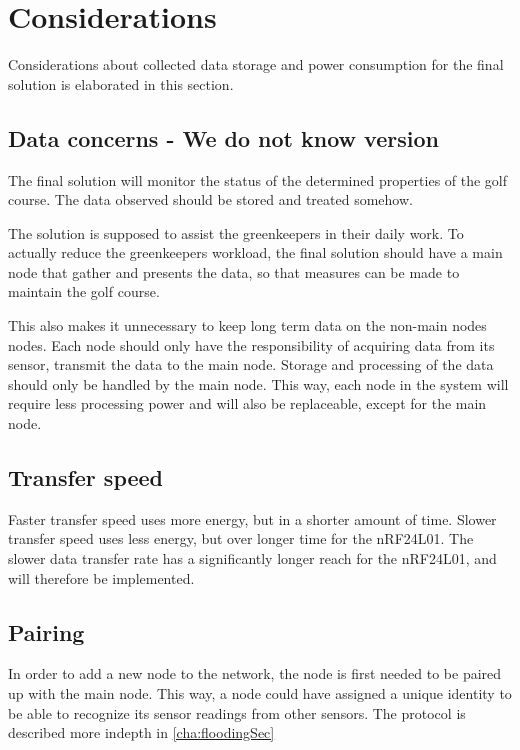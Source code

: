 \section{Considerations}
Considerations about collected data storage and power consumption for the final solution is elaborated in this section.

\subsection*{Data concerns - We do not know version}
The final solution will monitor the status of the determined properties of the golf course. The data observed should be stored and treated somehow.

The solution is supposed to assist the greenkeepers in their daily work. To actually reduce the greenkeepers workload, the final solution should have a main node that gather and presents the data, so that measures can be made to maintain the golf course.


This also makes it unnecessary to keep long term data on the non-main nodes nodes. 
Each node should only have the responsibility of acquiring data from its sensor, transmit the data to the main node. 
Storage and processing of the data should only be handled by the main node. 
This way, each node in the system will require less processing power and will also be replaceable, except for the main node.

\subsection{Transfer speed}
Faster transfer speed uses more energy, but in a shorter amount of time. Slower transfer speed uses less energy, but over longer time for the nRF24L01. The slower data transfer rate has a significantly longer reach for the nRF24L01, and will therefore be implemented. 

\subsection{Pairing}
In order to add a new node to the network, the node is first needed to be paired up with the main node.
This way, a node could have assigned a unique identity to be able to recognize its sensor readings from other sensors. 
The protocol is described more indepth in \ref{cha:floodingSec}
